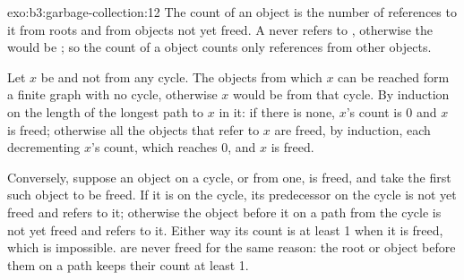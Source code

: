 \begin{solution}{exo:b3:garbage-collection:12}
The count of an object is the number of references to it from roots and from objects not yet freed. A  never refers to , otherwise the  would be ; so the count of a  object counts only references from other  objects.

Let $x$ be  and not  from any  cycle. The  objects from which $x$ can be reached form a finite graph with no cycle, otherwise $x$ would be  from that cycle. By induction on the length of the longest path to $x$ in it: if there is none, $x$'s count is 0 and $x$ is freed; otherwise all the objects that refer to $x$ are freed, by induction, each decrementing $x$'s count, which reaches 0, and $x$ is freed.

Conversely, suppose an object on a  cycle, or  from one, is freed, and take the first such object to be freed. If it is on the cycle, its predecessor on the cycle is not yet freed and refers to it; otherwise the object before it on a path from the cycle is not yet freed and refers to it. Either way its count is at least 1 when it is freed, which is impossible.  are never freed for the same reason: the root or object before them on a path keeps their count at least 1.
\end{solution}

